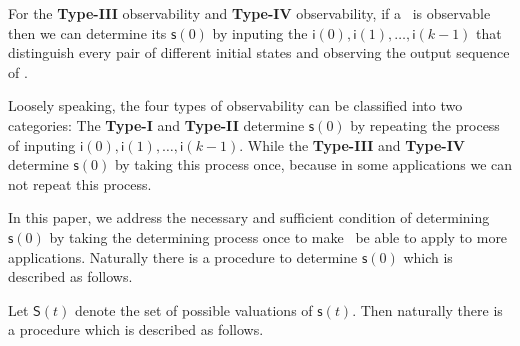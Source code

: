  For the {\bf Type-III} observability and {\bf Type-IV} observability, if a \BCN\ is observable then we can determine its $\mathsf{s}(0)$ by inputing the $\mathsf{i}(0),\mathsf{i}(1),\ldots,\mathsf{i}(k-1)$ that distinguish every pair of different initial states and observing the output sequence of \BCN.

Loosely speaking, the four types of observability can be classified into two categories:
The {\bf Type-I} and {\bf Type-II} determine $\mathsf{s}(0)$ by repeating the process of inputing $\mathsf{i}(0),\mathsf{i}(1),\ldots,\mathsf{i}(k-1)$. While the {\bf Type-III} and {\bf Type-IV} determine $\mathsf{s}(0)$ by taking this process once, because in some applications we can not repeat this process. %

In this paper, we address the necessary and sufficient condition of determining $\mathsf{s}(0)$ by taking the determining process once to make \BCN\ be able to apply to more applications. Naturally there is a procedure to determine $\mathsf{s}(0)$  which is described as follows. %


Let $\mathsf{S}(t)$ denote the set of possible valuations of $\mathsf{s}(t)$. Then naturally there is a procedure which is described as follows.

